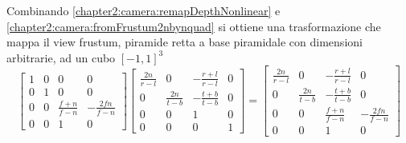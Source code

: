 Combinando \ref{chapter2:camera:remapDepthNonlinear} e \ref{chapter2:camera:fromFrustum2nbynquad} si ottiene una trasformazione che mappa il view
frustum, piramide retta a base piramidale con dimensioni arbitrarie, ad un cubo $[-1,1]^3$
\begin{equation}\label{chapter2:camera:perspectiveMatrix}
	\begin{bmatrix}
		1 & 0 & 0 & 0 \\ 0 & 1 & 0 & 0 \\ 0 & 0 & \frac{f+n}{f-n} & -\frac{2fn}{f-n} \\ 0 & 0 & 1 & 0
	\end{bmatrix}
	\begin{bmatrix}
		\frac{2n}{r-l} & 0 & -\frac{r+l}{r-l} & 0 \\ 0 & \frac{2n}{t-b} & -\frac{t+b}{t-b} & 0 \\ 0 & 0 & 1 & 0 \\ 0 & 0 & 0 & 1
	\end{bmatrix}
	=
	\begin{bmatrix}
		\frac{2n}{r-l} & 0 & -\frac{r+l}{r-l} & 0 \\ 0 & \frac{2n}{t-b} & -\frac{t+b}{t-b} & 0 \\ 0 & 0 & \frac{f+n}{f-n} & -\frac{2fn}{f-n} 
		\\ 0 & 0 & 1 & 0
	\end{bmatrix}
\end{equation}
